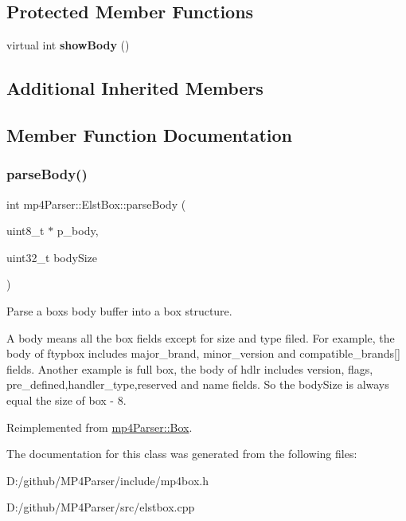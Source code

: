 \subsection*{Protected Member Functions}
\begin{DoxyCompactItemize}
\item 
\mbox{\label{classmp4_parser_1_1_elst_box_a3590a12da8f926827545dd6377e95629}} 
virtual int {\bfseries show\+Body} ()
\end{DoxyCompactItemize}
\subsection*{Additional Inherited Members}


\subsection{Member Function Documentation}
\mbox{\label{classmp4_parser_1_1_elst_box_a86d32e797d78cf7c00b81e2e34751324}} 
\subsubsection{\texorpdfstring{parseBody()}{parseBody()}}
{\footnotesize\ttfamily int mp4\+Parser\+::\+Elst\+Box\+::parse\+Body (\begin{DoxyParamCaption}\item[{uint8\+\_\+t $\ast$}]{p\+\_\+body,  }\item[{uint32\+\_\+t}]{body\+Size }\end{DoxyParamCaption})\hspace{0.3cm}{\ttfamily [virtual]}}



Parse a box\textquotesingle{}s body buffer into a box structure. 

A body means all the box fields except for size and type filed. For example, the body of ftypbox includes major\+\_\+brand, minor\+\_\+version and compatible\+\_\+brands\mbox{[}\mbox{]} fields. Another example is full box, the body of hdlr includes version, flags, pre\+\_\+defined,handler\+\_\+type,reserved and name fields. So the body\+Size is always equal the size of box -\/ 8. 

Reimplemented from \mbox{\hyperlink{classmp4_parser_1_1_box_a3dd0c084ac65bc77b69ac5ecaf796cb2}{mp4\+Parser\+::\+Box}}.



The documentation for this class was generated from the following files\+:\begin{DoxyCompactItemize}
\item 
D\+:/github/\+M\+P4\+Parser/include/mp4box.\+h\item 
D\+:/github/\+M\+P4\+Parser/src/elstbox.\+cpp\end{DoxyCompactItemize}
